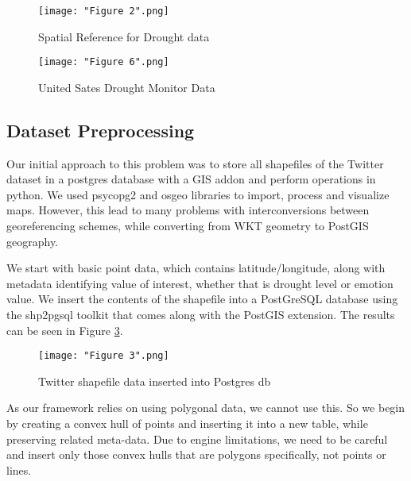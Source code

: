 \documentclass[conference]{IEEEtran}
\begin{document}
\begin{figure}[ht]
\centerline{\texttt{[image: "Figure 2".png]}}
\caption{Spatial Reference for Drought data}
\label{Figure 6}
\end{figure}

\begin{figure}[ht]
\centerline{\texttt{[image: "Figure 6".png]}}
\caption{United Sates Drought Monitor Data}
\label{Figure 2}
\end{figure}
\subsection{Dataset Preprocessing}

Our initial approach to this problem was to store all shapefiles of the Twitter dataset in a postgres database with a GIS addon and perform operations in python. We used psycopg2 and osgeo libraries to import, process and visualize maps. However, this lead to many problems with interconversions between georeferencing schemes, while converting from WKT geometry to PostGIS geography.

We start with basic point data, which contains latitude/longitude, along with metadata identifying value of interest, whether that is drought level or emotion value. We insert the contents of the shapefile into a PostGreSQL database using the shp2pgsql toolkit that comes along with the PostGIS extension. The results can be seen in Figure \ref{Figure 3}.

\begin{figure}[ht]
\centerline{\texttt{[image: "Figure 3".png]}}
\caption{Twitter shapefile data inserted into Postgres db}
\label{Figure 3}
\end{figure}

As our framework relies on using polygonal data, we cannot use this. So we begin by creating a convex hull of points and inserting it into a new table, while preserving related meta-data. Due to engine limitations, we need to be careful and insert only those convex hulls that are polygons specifically, not points or lines.
\end{document}
